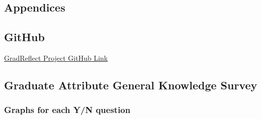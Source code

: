 \documentclass{l4proj}
\begin{document}
%
% 

\begin{appendices}

\chapter{Appendices}







\section{GitHub}\label{AppendixGitHub}

\href{https://github.com/gmtmcd/Level-4-Individual-Project}{GradReflect Project GitHub Link}

\section{Graduate Attribute General Knowledge Survey} \label{Appendix-gradAttributeSurvey}

\subsection{Graphs for each Y/N question}


\end{appendices}
\end{document}
